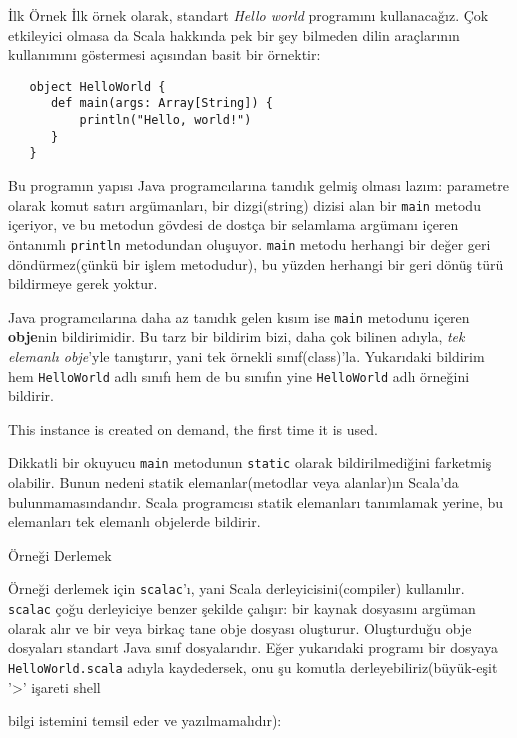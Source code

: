 \documentclass[10pt,a4paper]{book}
\begin{document}
\begin{chapter}{İlk Örnek}
İlk örnek olarak, standart \textit{Hello world} programını kullanacağız. Çok etkileyici olmasa da Scala hakkında pek bir şey bilmeden dilin araçlarının kullanımını göstermesi açısından basit bir örnektir:

\begin{verbatim}
   object HelloWorld {
      def main(args: Array[String]) {
          println("Hello, world!")
      }
   }
\end{verbatim}

Bu programın yapısı Java programcılarına tanıdık gelmiş olması lazım: parametre olarak komut satırı argümanları, bir dizgi(string) dizisi alan bir \texttt{main} metodu içeriyor, ve bu metodun gövdesi de dostça bir selamlama argümanı içeren öntanımlı \texttt{println} metodundan oluşuyor. \texttt{main} metodu herhangi bir değer geri döndürmez(çünkü bir işlem metodudur), bu yüzden herhangi bir geri dönüş türü bildirmeye gerek yoktur.

Java programcılarına daha az tanıdık gelen kısım ise \texttt{main} metodunu içeren \textbf{obje}nin bildirimidir. Bu tarz bir bildirim bizi, daha çok bilinen adıyla, \textit{tek elemanlı obje}'yle tanıştırır, yani tek örnekli sınıf(class)'la. Yukarıdaki bildirim hem \texttt{HelloWorld} adlı sınıfı hem de bu sınıfın yine \texttt{HelloWorld} adlı örneğini bildirir. \begin{comment} hocam bu kısmı anlayamadım -> \end{comment} This instance is created on demand, the first time it is used. 

Dikkatli bir okuyucu \texttt{main} metodunun \texttt{static} olarak bildirilmediğini farketmiş olabilir. Bunun nedeni statik elemanlar(metodlar veya alanlar)ın Scala'da bulunmamasındandır. Scala programcısı statik elemanları tanımlamak yerine, bu elemanları tek elemanlı objelerde bildirir.

\begin{section}{Örneği Derlemek}

Örneği derlemek için \texttt{scalac}'ı, yani Scala derleyicisini(compiler) kullanılır. \texttt{scalac} çoğu derleyiciye benzer şekilde çalışır: bir kaynak dosyasını argüman olarak alır ve bir veya birkaç tane obje dosyası oluşturur. Oluşturduğu obje dosyaları standart Java sınıf dosyalarıdır.
Eğer yukarıdaki programı bir dosyaya \texttt{HelloWorld.scala} adıyla kaydedersek, onu şu komutla derleyebiliriz(büyük-eşit '>' işareti shell \begin{comment} kabuk yazayım mı? \end{comment} bilgi istemini temsil eder ve yazılmamalıdır):


\end{section}
\end{chapter}
\end{document}
